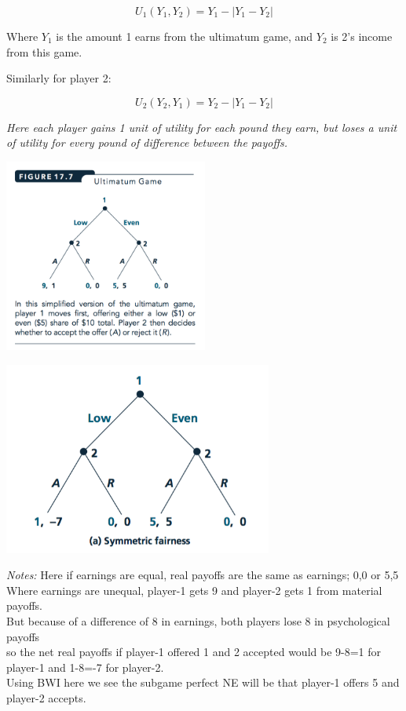\documentclass[]{article}
\begin{document}
\bigskip

\[U_1(Y_1,Y_2) = Y_1 - |Y_1-Y_2|\]

\bigskip

Where \(Y_1\) is the amount 1 earns from the ultimatum game, and \(Y_2\) is 2's income from this game.

\bigskip

Similarly for player 2:

\[U_2(Y_2,Y_1) = Y_2 - |Y_1-Y_2|\]

\bigskip

\emph{Here each player gains 1 unit of utility for each pound they earn, but loses a unit of utility for every pound of difference between the payoffs.}

\includegraphics[height=2.5in]{picsfigs/ultimatumgametree.png}

\includegraphics[height=2.5in]{picsfigs/ultimatumfairness.png}

\emph{Notes:}
Here if earnings are equal, real payoffs are the same as earnings; 0,0 or 5,5\\
Where earnings are unequal, player-1 gets 9 and player-2 gets 1 from material payoffs.\\
But because of a difference of 8 in earnings, both players lose 8 in psychological payoffs\\
so the net real payoffs if player-1 offered 1 and 2 accepted would be 9-8=1 for player-1 and 1-8=-7 for player-2.\\
Using BWI here we see the subgame perfect NE will be that player-1 offers 5 and player-2 accepts.
\end{document}
